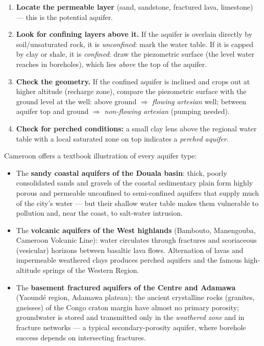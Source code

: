 \documentclass[11pt]{article}
\newcounter{popsec}
\newcounter{popsub}
\newcommand{\courssub}[1]{%
  \stepcounter{popsub}%
  \par\vspace{9pt}\noindent{\popxbold\fontsize{11.5}{13}\selectfont\color{popink}{\color{poporange}\thepopsec.\thepopsub}\hspace{6pt}#1}\par\nopagebreak\vspace{4pt}
}
\begin{document}
\begin{methode}
\begin{enumerate}
\item \textbf{Locate the permeable layer} (sand, sandstone, fractured lava, limestone) — this is the potential aquifer.
\item \textbf{Look for confining layers above it.} If the aquifer is overlain directly by soil/unsaturated rock, it is \emph{unconfined}: mark the water table. If it is capped by clay or shale, it is \emph{confined}: draw the piezometric surface (the level water reaches in boreholes), which lies \emph{above} the top of the aquifer.
\item \textbf{Check the geometry.} If the confined aquifer is inclined and crops out at higher altitude (recharge zone), compare the piezometric surface with the ground level at the well: above ground $\Rightarrow$ \emph{flowing artesian} well; between aquifer top and ground $\Rightarrow$ \emph{non-flowing artesian} (pumping needed).
\item \textbf{Check for perched conditions:} a small clay lens above the regional water table with a local saturated zone on top indicates a \emph{perched aquifer}.
\end{enumerate}
\end{methode}

\courssub{Cameroonian Examples}

\begin{savaistu}
Cameroon offers a textbook illustration of every aquifer type:
\begin{itemize}
\item The \textbf{sandy coastal aquifers of the Douala basin}: thick, poorly consolidated sands and gravels of the coastal sedimentary plain form highly porous and permeable unconfined to semi-confined aquifers that supply much of the city's water — but their shallow water table makes them vulnerable to pollution and, near the coast, to salt-water intrusion.
\item The \textbf{volcanic aquifers of the West highlands} (Bambouto, Manengouba, Cameroon Volcanic Line): water circulates through fractures and scoriaceous (vesicular) horizons between basaltic lava flows. Alternation of lavas and impermeable weathered clays produces perched aquifers and the famous high-altitude springs of the Western Region.
\item The \textbf{basement fractured aquifers of the Centre and Adamawa} (Yaoundé region, Adamawa plateau): the ancient crystalline rocks (granites, gneisses) of the Congo craton margin have almost no primary porosity; groundwater is stored and transmitted only in the \emph{weathered zone} and in fracture networks — a typical secondary-porosity aquifer, where borehole success depends on intersecting fractures.
\end{itemize}
\end{savaistu}
\end{document}
